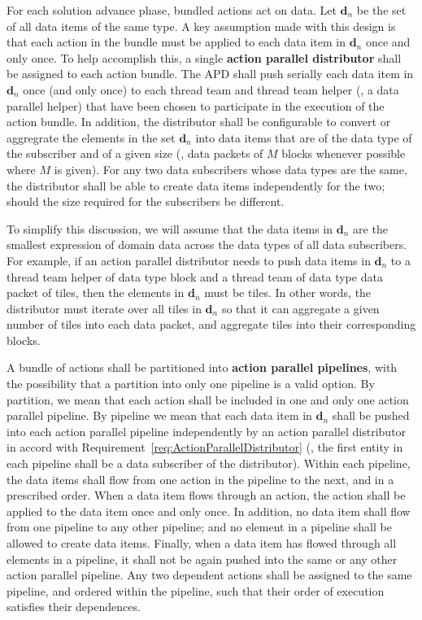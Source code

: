 \documentclass{article}
\begin{document}
\begin{req}
\label{req:ActionParallelDistributor}
For each solution advance phase, bundled actions act on data.
Let $\mathbf{d}_n$ be the set of all data items of the same type.  A key
assumption made with this design is that each action in the bundle must be
applied to each data item in $\mathbf{d}_n$ once and only once.  To help
accomplish this, a single \textbf{action parallel distributor} shall be
assigned to each action bundle. The APD shall push serially each data item
in $\mathbf{d}_n$ once (and only once) to each
thread team and thread team helper (\eg, a data parallel helper) that have
been chosen to participate in the execution of the action bundle. In addition, the
distributor shall be configurable to
convert or aggregrate the elements in the set $\mathbf{d}_n$ into data items
that are of the data type of the subscriber and of a given size (\eg, data
packets of $M$ blocks whenever possible where $M$ is given).  For any two data
subscribers whose data types are the same, the distributor shall be able to
create data items independently for the two; should the size required for the
subscribers be different.
\end{req}

To simplify this discussion, we will assume that the data items in $\mathbf{d}_n$
are the smallest expression of domain data across the data types of all data
subscribers.  For example, if an action parallel distributor needs
to push data items in $\mathbf{d}_n$ to a thread team helper of data type block
and a thread team of data type data packet of tiles, then the elements in
$\mathbf{d}_n$ must be tiles.  In other words, the distributor must iterate over
all tiles in $\mathbf{d}_n$ so that it can aggregate a given number of tiles
into each data packet, and aggregate tiles into their corresponding blocks.

\begin{req}
\label{req:ActionParallelPipelines}
A bundle of actions shall be partitioned into \textbf{action parallel pipelines},
with the possibility that a partition into only one pipeline is a valid option.  By
partition, we mean that each action shall be included in one and only one action
parallel pipeline.  By pipeline we mean that each data item in $\mathbf{d}_n$
shall be pushed into each action parallel pipeline independently by an action
parallel distributor in accord with
Requirement~\ref{req:ActionParallelDistributor} (\ie, the first entity in
 each pipeline shall be a data subscriber of the distributor).
Within each pipeline, the data items shall flow from one action in the
pipeline to the next, and in a prescribed order.  When a data item flows through
an action, the action shall be applied to the data item once and only once.  In
addition, no data item shall flow from one pipeline to any other pipeline; and no
element in a pipeline shall be allowed to create data items.  Finally, when a data
item has flowed through all elements in a pipeline, it shall not be again pushed into
the same or any other action parallel pipeline.  Any two dependent actions shall
be assigned to the same pipeline, and ordered within the pipeline, such that their
order of execution satisfies their dependences.
\end{req}
\end{document}
